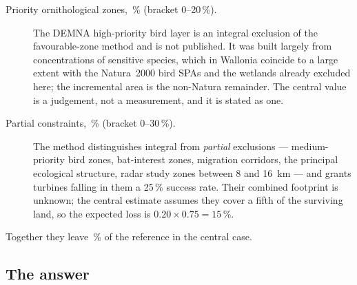 \documentclass[11pt,a4paper]{article}
\begin{document}
\begin{description}
  \item[Priority ornithological zones, \ResOrnithology{}\,\% (bracket
    0--20\,\%).] The DEMNA high-priority bird layer is an integral exclusion of
    the favourable-zone method and is not published. It was built largely from
    concentrations of sensitive species, which in Wallonia coincide to a large
    extent with the Natura~2000 bird SPAs and the wetlands already excluded
    here; the incremental area is the non-Natura remainder. The central value is
    a judgement, not a measurement, and it is stated as one.
  \item[Partial constraints, \ResPartial{}\,\% (bracket 0--30\,\%).] The method
    distinguishes integral from \emph{partial} exclusions --- medium-priority
    bird zones, bat-interest zones, migration corridors, the principal
    ecological structure, radar study zones between 8 and \SI{16}{\kilo\metre}
    --- and grants turbines falling in them a 25\,\% success rate. Their
    combined footprint is unknown; the central estimate assumes they cover a
    fifth of the surviving land, so the expected loss is
    $0.20\times0.75 = 15\,\%$.
\end{description}

Together they leave \ResSurvival{}\,\% of the reference in the central case.

\subsection{The answer}\label{sec:answer}
\end{document}
